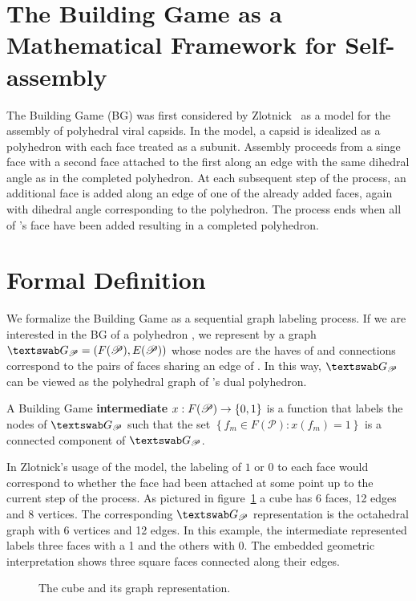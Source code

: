 \section{The Building Game as a Mathematical Framework for Self-assembly}

The Building Game (BG) was first considered by Zlotnick~\cite{Zlotnick1994} as a model for the assembly of polyhedral viral capsids. In the model, a capsid is idealized as a polyhedron \poly with each face treated as a subunit. Assembly proceeds from a singe face with a second face attached to the first along an edge with the same dihedral angle as in the completed polyhedron. At each subsequent step of the process, an additional face is added along an edge of one of the already added faces, again with dihedral angle corresponding to the polyhedron. The process ends when all of \poly's face have been added resulting in a completed polyhedron.

\section{Formal Definition}

We formalize the Building Game as a sequential graph labeling process. If we are interested in the BG of a polyhedron \poly, we represent \poly\spc by a graph $\PolyGraph = \left(F(\Poly), E(\Poly)\right)$ whose nodes are the haves of \poly\spc and connections correspond to the pairs of faces sharing an edge of \poly. In this way, $\PolyGraph$ can be viewed as the polyhedral graph of \poly's dual polyhedron. 
\begin{mydef}
A Building Game \textbf{intermediate} $x: F(\mathscr{P}) \to \{0,1\}$ is a function that labels the nodes of $\PolyGraph$ such that the set $\left\{f_m \in F\left(\mathscr{P}\right) : x\left(f_m\right) = 1\right\}$ is a connected component of $\PolyGraph$.
\end{mydef} 
In Zlotnick's usage of the model, the labeling of $1$ or $0$ to each face would correspond to whether the face had been attached at some point up to the current step of the process. As pictured in figure~\ref{fig:CubeGraph} a cube has 6 faces, 12 edges and 8 vertices. The corresponding $\PolyGraph$ representation is the octahedral graph with 6 vertices and 12 edges. In this example, the intermediate represented labels three faces with a 1 and the others with 0. The embedded geometric interpretation shows three square faces connected along their edges.

\begin{figure}[ht]
\caption{The cube and its graph representation.}
\label{fig:CubeGraph}
\end{figure}

